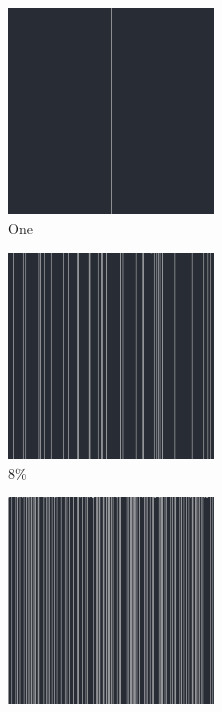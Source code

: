 \documentclass[12pt, fleqn]{report}                             %
\theoremstyle{break}                                            %
\begin{document}
      \begin{figure}[ht!]
        \centering
        \begin{subfigure}[b]{0.4\linewidth}
          \includegraphics[width=0.6\textwidth]{Images/132/a.png}
          \caption{One}
        \end{subfigure}
        \begin{subfigure}[b]{0.4\linewidth}
          \includegraphics[width=0.6\textwidth]{Images/132/b.png}
          \caption{8\%}
        \end{subfigure}
        \begin{subfigure}[b]{0.4\linewidth}
          \includegraphics[width=0.6\textwidth]{Images/132/c.png}

\end{subfigure}
\end{figure}
\end{document}
